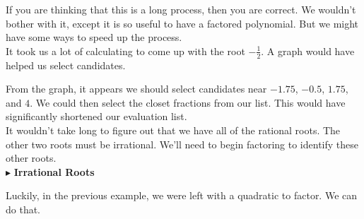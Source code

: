 \documentclass{ximera}
\begin{document}
If you are thinking that this is a long process, then you are correct.  We wouldn't bother with it, except it is so useful to have a factored polynomial.  But we might have some ways to speed up the process.  \\

It took us a lot of calculating to come up with the root $-\frac{1}{2}$.  A graph would have helped us select candidates.


\begin{center}
\end{center}


From the graph, it appears we should select candidates near $-1.75$, $-0.5$, $1.75$, and $4$. We could then select the closet fractions from our list. This would have significantly shortened our evaluation list.  \\

It wouldn't take long to figure out that we have all of the rational roots. The other two roots must be irrational.  We'll need to begin factoring to identify these other roots. \\



$\blacktriangleright$ \textbf{\textcolor{blue!55!black}{Irrational Roots}} 


Luckily, in the previous example, we were left with a quadratic to factor.  We can do that.
\end{document}
